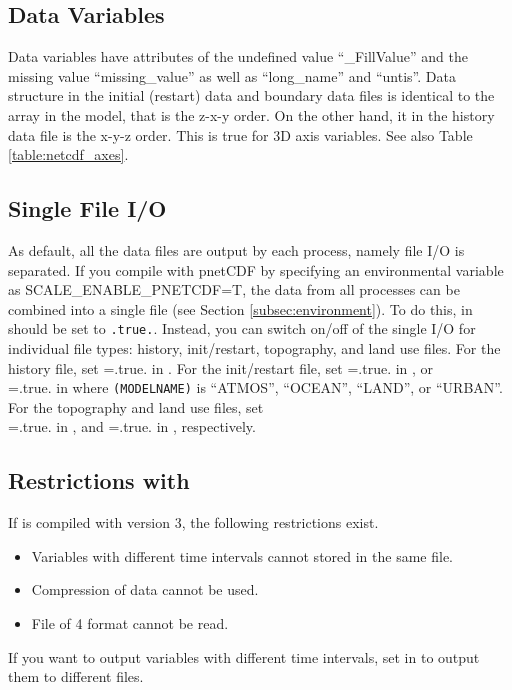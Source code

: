 \subsection{Data Variables}
Data variables have attributes of the undefined value ``\_FillValue'' and 
the missing value ``missing\_value'' as well as ``long\_name'' and ``untis''.
Data structure in the initial (restart) data and boundary data files 
is identical to the array in the model, that is the z-x-y order.
On the other hand, it in the history data file is the x-y-z order.
This is true for 3D axis variables.
See also Table \ref{table:netcdf_axes}.



\subsection{Single File I/O} \label{subsec:single_io}
As default, all the data files are output by each process, namely file I/O is separated.
If you compile \scalerm with pnetCDF by specifying an environmental variable as SCALE\_ENABLE\_PNETCDF=T,
the data from all processes can be combined into a single file (see Section \ref{subsec:environment}).
To do this,  in  should be set to \verb|.true.|.
Instead, you can switch on/off of the single I/O for individual file types: history, init/restart, topography, and land use files. 
For the history file, set =.true. in .
For the init/restart file, set =.true. in , or \\ 
=.true. in  
where \verb|(MODELNAME)| is ``ATMOS'', ``OCEAN'', ``LAND'', or ``URBAN''.
For the topography and land use files, set \\ 
=.true. in , 
and =.true. in , respectively.


\subsection{Restrictions with }
If \scale is compiled with \netcdf version 3, the following restrictions exist.
\begin{itemize}
\item Variables with different time intervals cannot stored in the same file.
\item Compression of data cannot be used.
\item File of {\netcdf}4 format cannot be read.
\end{itemize}
If you want to output variables with different time intervals, set  in  to output them to different files.

